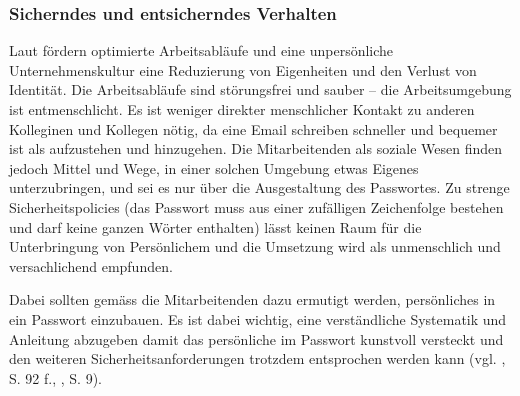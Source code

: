 \documentclass[../../main.tex]{subfiles}
\begin{document}
\subsubsection{Sicherndes und entsicherndes Verhalten}

\begin{sloppypar}
Laut \citeauthor{helisch_security_2009} fördern optimierte Arbeitsabläufe und eine unpersönliche Unternehmenskultur eine Reduzierung von Eigenheiten und den Verlust von Identität. Die Arbeitsabläufe sind störungsfrei und sauber -- die Arbeitsumgebung ist entmenschlicht. Es ist weniger direkter menschlicher Kontakt zu anderen Kolleginen und Kollegen nötig, da eine Email schreiben schneller und bequemer ist als aufzustehen und hinzugehen. Die Mitarbeitenden als soziale Wesen finden jedoch Mittel und Wege, in einer solchen Umgebung etwas Eigenes unterzubringen, und sei es nur über die Ausgestaltung des Passwortes. Zu strenge Sicherheitspolicies (das Passwort muss aus einer zufälligen Zeichenfolge bestehen und darf keine ganzen Wörter enthalten) lässt keinen Raum für die Unterbringung von Persönlichem und die Umsetzung wird als unmenschlich und versachlichend empfunden. 

Dabei sollten gemäss \citeauthor{helisch_security_2009} die Mitarbeitenden dazu ermutigt werden, persönliches in ein Passwort einzubauen. Es ist dabei wichtig, eine verständliche Systematik und Anleitung abzugeben damit das persönliche im Passwort kunstvoll versteckt und den weiteren Sicherheitsanforderungen trotzdem entsprochen werden kann (vgl. \citeauthor{helisch_security_2009} \citeyear{helisch_security_2009}, S. 92 f., \citeauthor{marchesi_security_2014} \citeyear{marchesi_security_2014}, S. 9).

\end{sloppypar}
\end{document}
